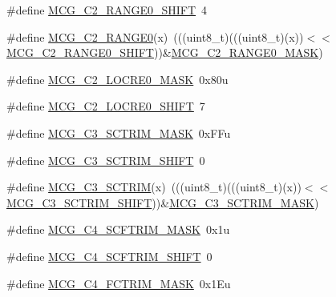 \begin{DoxyCompactItemize}
\item 
\#define \hyperlink{group___m_c_g___register___masks_gaca9dfaea66978e556c7a9773e2c8c531}{M\+C\+G\+\_\+\+C2\+\_\+\+R\+A\+N\+G\+E0\+\_\+\+S\+H\+I\+FT}~4
\item 
\#define \hyperlink{group___m_c_g___register___masks_ga4717ad2318b6cbc4586d554b59d0382e}{M\+C\+G\+\_\+\+C2\+\_\+\+R\+A\+N\+G\+E0}(x)~(((uint8\+\_\+t)(((uint8\+\_\+t)(x))$<$$<$\hyperlink{group___m_c_g___register___masks_gaca9dfaea66978e556c7a9773e2c8c531}{M\+C\+G\+\_\+\+C2\+\_\+\+R\+A\+N\+G\+E0\+\_\+\+S\+H\+I\+FT}))\&\hyperlink{group___m_c_g___register___masks_ga5436f4e93034d8536c23eabcac1b1a43}{M\+C\+G\+\_\+\+C2\+\_\+\+R\+A\+N\+G\+E0\+\_\+\+M\+A\+SK})
\item 
\#define \hyperlink{group___m_c_g___register___masks_gae89f2e48b02a39563115d1a60dc8f16f}{M\+C\+G\+\_\+\+C2\+\_\+\+L\+O\+C\+R\+E0\+\_\+\+M\+A\+SK}~0x80u
\item 
\#define \hyperlink{group___m_c_g___register___masks_gabc900505d9a12bd7a33c2a5e3cfdf02a}{M\+C\+G\+\_\+\+C2\+\_\+\+L\+O\+C\+R\+E0\+\_\+\+S\+H\+I\+FT}~7
\item 
\#define \hyperlink{group___m_c_g___register___masks_ga44433c6372539508fbf3090b591f3d89}{M\+C\+G\+\_\+\+C3\+\_\+\+S\+C\+T\+R\+I\+M\+\_\+\+M\+A\+SK}~0x\+F\+Fu
\item 
\#define \hyperlink{group___m_c_g___register___masks_ga8b5c3c55be188745fefec24b945110b7}{M\+C\+G\+\_\+\+C3\+\_\+\+S\+C\+T\+R\+I\+M\+\_\+\+S\+H\+I\+FT}~0
\item 
\#define \hyperlink{group___m_c_g___register___masks_ga66a74a75c9244dad3298474a2bf04de8}{M\+C\+G\+\_\+\+C3\+\_\+\+S\+C\+T\+R\+IM}(x)~(((uint8\+\_\+t)(((uint8\+\_\+t)(x))$<$$<$\hyperlink{group___m_c_g___register___masks_ga8b5c3c55be188745fefec24b945110b7}{M\+C\+G\+\_\+\+C3\+\_\+\+S\+C\+T\+R\+I\+M\+\_\+\+S\+H\+I\+FT}))\&\hyperlink{group___m_c_g___register___masks_ga44433c6372539508fbf3090b591f3d89}{M\+C\+G\+\_\+\+C3\+\_\+\+S\+C\+T\+R\+I\+M\+\_\+\+M\+A\+SK})
\item 
\#define \hyperlink{group___m_c_g___register___masks_ga7386e83fdee774ec5d6ec402bae1e432}{M\+C\+G\+\_\+\+C4\+\_\+\+S\+C\+F\+T\+R\+I\+M\+\_\+\+M\+A\+SK}~0x1u
\item 
\#define \hyperlink{group___m_c_g___register___masks_ga1114052674119b01137ef4b4885ab757}{M\+C\+G\+\_\+\+C4\+\_\+\+S\+C\+F\+T\+R\+I\+M\+\_\+\+S\+H\+I\+FT}~0
\item 
\#define \hyperlink{group___m_c_g___register___masks_ga91610035649d14c5027419db0bfa3231}{M\+C\+G\+\_\+\+C4\+\_\+\+F\+C\+T\+R\+I\+M\+\_\+\+M\+A\+SK}~0x1\+Eu

\end{DoxyCompactItemize}
